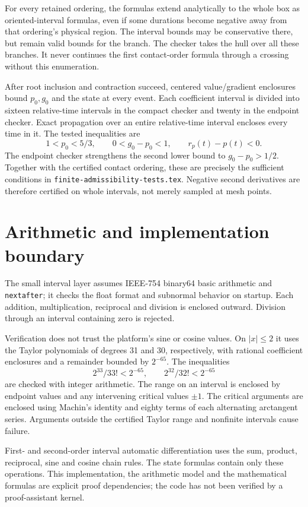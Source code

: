 \documentclass[11pt]{article}
\begin{document}
For every retained ordering, the formulas extend analytically to the whole box as oriented-interval formulas, even if some durations become negative away from that ordering's physical region. The interval bounds may be conservative there, but remain valid bounds for the branch. The checker takes the hull over all these branches. It never continues the first contact-order formula through a crossing without this enumeration.

After root inclusion and contraction succeed, centered value/gradient enclosures bound $p_0,g_0$ and the state at every event. Each coefficient interval is divided into sixteen relative-time intervals in the compact checker and twenty in the endpoint checker. Exact propagation over an entire relative-time interval encloses every time in it. The tested inequalities are
\[
 1<p_0<5/3,\qquad 0<g_0-p_0<1,\qquad r_p(t)-p(t)<0.
\]
The endpoint checker strengthens the second lower bound to $g_0-p_0>1/2$. Together with the certified contact ordering, these are precisely the sufficient conditions in \texttt{finite-admissibility-tests.tex}. Negative second derivatives are therefore certified on whole intervals, not merely sampled at mesh points.

\section{Arithmetic and implementation boundary}
The small interval layer assumes IEEE-754 binary64 basic arithmetic and \texttt{nextafter}; it checks the float format and subnormal behavior on startup. Each addition, multiplication, reciprocal and division is enclosed outward. Division through an interval containing zero is rejected.

Verification does not trust the platform's sine or cosine values. On $|x|\le2$ it uses the Taylor polynomials of degrees 31 and 30, respectively, with rational coefficient enclosures and a remainder bounded by $2^{-65}$. The inequalities
\[
 2^{33}/33!<2^{-65},\qquad 2^{32}/32!<2^{-65}
\]
are checked with integer arithmetic. The range on an interval is enclosed by endpoint values and any intervening critical values $\pm1$. The critical arguments are enclosed using Machin's identity and eighty terms of each alternating arctangent series. Arguments outside the certified Taylor range and nonfinite intervals cause failure.

First- and second-order interval automatic differentiation uses the sum, product, reciprocal, sine and cosine chain rules. The state formulas contain only these operations. This implementation, the arithmetic model and the mathematical formulas are explicit proof dependencies; the code has not been verified by a proof-assistant kernel.
\end{document}
